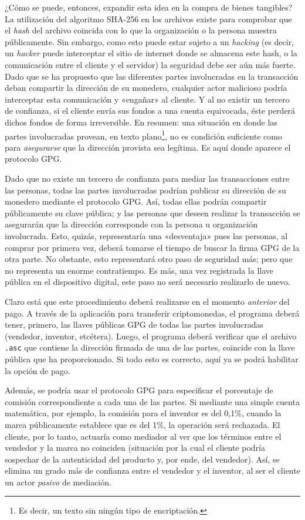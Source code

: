 \documentclass[12pt,a4paper]{article}
\begin{document}
¿Cómo se puede, entonces, expandir esta idea en la compra de bienes tangibles? La utilización del algoritmo SHA-256 en los archivos existe para comprobar que el \textit{hash} del archivo coincida con lo que la organización o la persona muestra públicamente. Sin embargo, como esto puede estar sujeto a un \textit{hacking} (es decir, un \textit{hacker} puede interceptar el sitio de internet donde se almacena este hash, o la comunicación entre el cliente y el servidor) la seguridad debe ser aún más fuerte. Dado que se ha propuesto que las diferentes partes involucradas en la transacción deban compartir la dirección de su monedero, cualquier actor malicioso podría interceptar esta comunicación y «engañar» al cliente. Y al no existir un tercero de confianza, si el cliente envía sus fondos a una cuenta equivocada, éste perderá dichos fondos de forma irreversible. En resumen: una situación en donde las partes involucradas provean, en texto plano\footnote{Es decir, un texto sin ningún tipo de encriptación.}, no es condición suficiente como para \textit{asegurarse} que la dirección provista sea legítima. Es aquí donde aparece el protocolo GPG.

Dado que no existe un tercero de confianza para mediar las transacciones entre las personas, todas las partes involucradas podrían publicar su dirección de su monedero mediante el protocolo GPG. Así, todas ellas podrán compartir públicamente su clave pública; y las personas que deseen realizar la transacción se asegurarán que la dirección corresponde con la persona u organización involucrada. Esto, quizás, representaría una «desventaja» pues las personas, al comprar por primera vez, deberá tomarse el tiempo de buscar la firma GPG de la otra parte. No obstante, esto representará otro paso de seguridad más; pero que no representa un enorme contratiempo. Es más, una vez registrada la llave pública en el dispositivo digital, este paso no será necesario realizarlo de nuevo.

Claro está que este procedimiento deberá realizarse en el momento \textit{anterior} del pago. A través de la aplicación para transferir criptomonedas, el programa deberá tener, primero, las llaves públicas GPG de todas las partes involucradas (vendedor, inventor, etcétera). Luego, el programa deberá verificar que el archivo \texttt{.asc} que contiene la dirección firmada de una de las partes, coincide con la llave pública que ha proporcionado. Si todo esto es correcto, aquí ya se podrá habilitar la opción de pago.

Además, se podría usar el protocolo GPG para especificar el porcentaje de comisión correspondiente a cada una de las partes. Si mediante una simple cuenta matemática, por ejemplo, la comisión para el inventor es del 0,1\%, cuando la marca públicamente establece que es del 1\%, la operación será rechazada. El cliente, por lo tanto, actuaría como mediador al ver que los términos entre el vendedor y la marca no coinciden (situación por la cual el cliente podría sospechar de la autenticidad del producto y, por ende, del vendedor). Así, se elimina un grado más de confianza entre el vendedor y el inventor, al ser el cliente un actor \textit{pasivo} de mediación.
\end{document}
